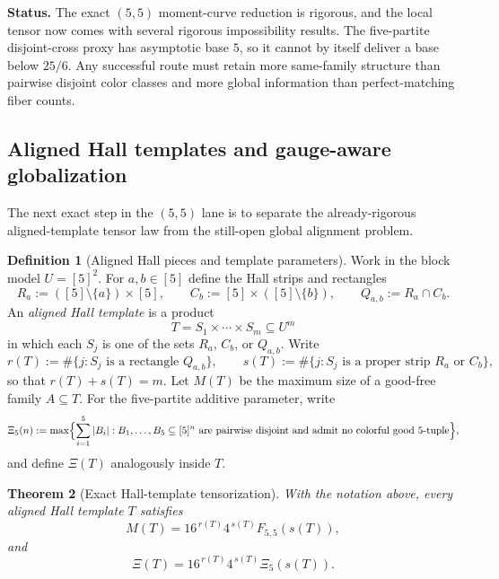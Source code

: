 \documentclass[11pt]{article}
\newtheorem{theorem}{Theorem}[section]
\theoremstyle{definition}
\newtheorem{definition}[theorem]{Definition}
\newcommand{\1}{\mathbf{1}}
\newcommand{\status}[1]{\par\smallskip\noindent\textbf{Status.} #1\par\smallskip}
\begin{document}
\status{The exact $(5,5)$ moment-curve reduction is rigorous, and the local tensor now comes with several rigorous impossibility results. The five-partite disjoint-cross proxy has asymptotic base $5$, so it cannot by itself deliver a base below $25/6$. Any successful route must retain more same-family structure than pairwise disjoint color classes and more global information than perfect-matching fiber counts.}

\subsection*{Aligned Hall templates and gauge-aware globalization}
The next exact step in the $(5,5)$ lane is to separate the already-rigorous aligned-template tensor law from the still-open global alignment problem.

\begin{definition}[Aligned Hall pieces and template parameters]\label{def:555-aligned-template}
Work in the block model $U=[5]^2$.
For $a,b\in [5]$ define the Hall strips and rectangles
\[
R_a:=([5]\setminus\{a\})\times [5],
\qquad
C_b:=[5]\times([5]\setminus\{b\}),
\qquad
Q_{a,b}:=R_a\cap C_b.
\]
An \emph{aligned Hall template} is a product
\[
T=S_1\times\cdots\times S_m\subseteq U^m
\]
in which each $S_j$ is one of the sets $R_a$, $C_b$, or $Q_{a,b}$.
Write
\[
r(T):=\#\{j:S_j\text{ is a rectangle }Q_{a,b}\},
\qquad
s(T):=\#\{j:S_j\text{ is a proper strip }R_a\text{ or }C_b\},
\]
so that $r(T)+s(T)=m$.
Let $M(T)$ be the maximum size of a good-free family $A\subseteq T$.
For the five-partite additive parameter, write
\[
\Xi_5(n):=
\max\Bigl\{\sum_{i=1}^5 |B_i|:
B_1,\dots,B_5\subseteq [5]^n\text{ are pairwise disjoint and admit no colorful good }5\text{-tuple}\Bigr\},
\]
and define $\Xi(T)$ analogously inside $T$.
\end{definition}

\begin{theorem}[Exact Hall-template tensorization]\label{thm:555-hall-template-tensorization}
With the notation above, every aligned Hall template $T$ satisfies
\[
M(T)=16^{\,r(T)}4^{\,s(T)}F_{5,5}(s(T)),
\]
and
\[
\Xi(T)=16^{\,r(T)}4^{\,s(T)}\Xi_5(s(T)).
\]
\end{theorem}
\end{document}
